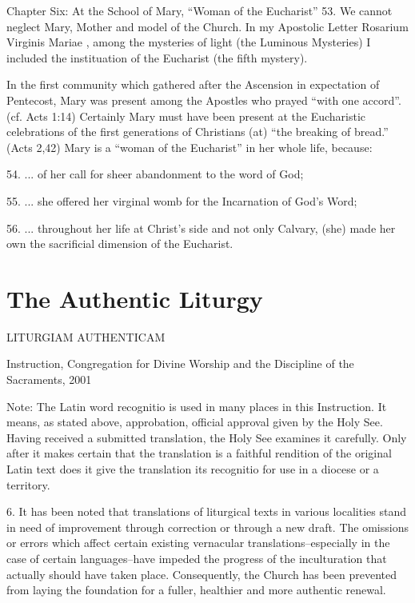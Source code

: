 \documentclass[oneside]{book}
\begin{document}
Chapter Six: At the School of Mary, ``Woman of the Eucharist''
53. We cannot neglect Mary, Mother and model of the Church. In my Apostolic
Letter Rosarium Virginis Mariae , among the mysteries of light (the Luminous
Mysteries) I included the instituation of the Eucharist (the fifth mystery). 

 In the first community which gathered after the Ascension in expectation of
 Pentecost, Mary was present among the Apostles who prayed ``with one
 accord''. (cf. Acts 1:14) Certainly Mary must have been present at the
 Eucharistic celebrations of the first generations of Christians (at) ``the
 breaking of bread.'' (Acts  2,42)  Mary is a ``woman of the Eucharist'' in her
 whole life, because:

54. ... of her call for sheer abandonment to the word of God;

55. ... she offered her virginal womb for the Incarnation of God's Word;

56. ... throughout her life at Christ's side and not only Calvary, (she) made
her own the sacrificial dimension of the Eucharist.


\chapter{The Authentic Liturgy}

LITURGIAM AUTHENTICAM

Instruction, Congregation for Divine Worship and
  the Discipline of the Sacraments, 2001


Note: The Latin word recognitio is used in many places in this Instruction. It
means, as stated above, approbation, official approval given by the Holy
See. Having received a submitted translation, the Holy See examines it
carefully. Only after it makes certain that the translation is a faithful
rendition of the original Latin text does it give the translation its recognitio
for use in a diocese or a territory.

6. It has been noted that translations of liturgical texts in various localities
stand in need of improvement through correction or through a new draft. The
omissions or errors which affect certain existing vernacular
translations--especially in the case of certain languages--have impeded the
progress of the inculturation that actually should have taken
place. Consequently, the Church has been prevented from laying the foundation
for a fuller, healthier and more authentic renewal.
\end{document}
